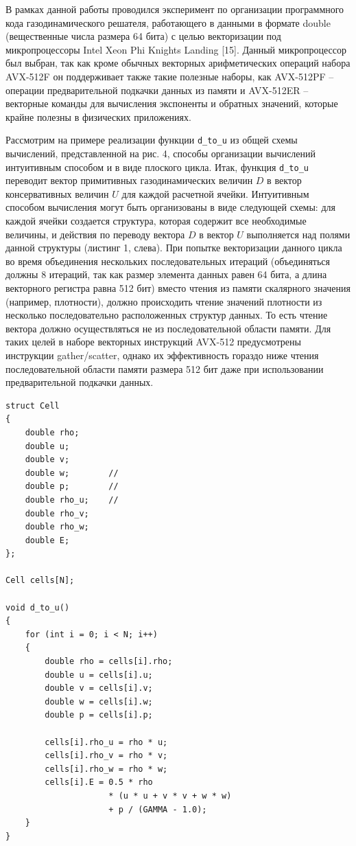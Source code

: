 В рамках данной работы проводился эксперимент по организации программного кода газодинамического решателя, работающего в данными в формате double (вещественные числа размера 64 бита) с целью векторизации под микропроцессоры Intel Xeon Phi Knights Landing [15].
Данный микропроцессор был выбран, так как кроме обычных векторных арифметических операций набора AVX-512F он поддерживает также такие полезные наборы, как AVX-512PF -- операции предварительной подкачки данных из памяти и AVX-512ER -- векторные команды для вычисления экспоненты и обратных значений, которые крайне полезны в физических приложениях.

Рассмотрим на примере реализации функции \texttt{d\_to\_u} из общей схемы вычислений, представленной на рис. 4, способы организации вычислений интуитивным способом и в виде плоского цикла.
Итак, функция \texttt{d\_to\_u} переводит вектор примитивных газодинамических величин $D$ в вектор консервативных величин $U$ для каждой расчетной ячейки.
Интуитивным способом вычисления могут быть организованы в виде следующей схемы: для каждой ячейки создается структура, которая содержит все необходимые величины, и действия по переводу вектора $D$ в вектор $U$ выполняется над полями данной структуры (листинг 1, слева).
При попытке векторизации данного цикла во время объединения нескольких последовательных итераций (объединяться должны 8 итераций, так как размер элемента данных равен 64 бита, а длина векторного регистра равна 512 бит) вместо чтения из памяти скалярного значения (например, плотности), должно происходить чтение значений плотности из несколько последовательно расположенных структур данных.
То есть чтение вектора должно осуществляться не из последовательной области памяти.
Для таких целей в наборе векторных инструкций AVX-512 предусмотрены инструкции gather/scatter, однако их эффективность гораздо ниже чтения последовательной области памяти размера 512 бит даже при использовании предварительной подкачки данных.

\begin{lstlisting}[caption={caption},label={label}]
struct Cell
{
    double rho;
    double u;
    double v;
    double w;        // 
    double p;        // 
    double rho_u;    // 
    double rho_v;
    double rho_w;
    double E;
};

Cell cells[N];

void d_to_u()
{
    for (int i = 0; i < N; i++)
    {
        double rho = cells[i].rho;
        double u = cells[i].u;
        double v = cells[i].v;
        double w = cells[i].w;
        double p = cells[i].p;

        cells[i].rho_u = rho * u;
        cells[i].rho_v = rho * v;
        cells[i].rho_w = rho * w;
        cells[i].E = 0.5 * rho
                     * (u * u + v * v + w * w)
                     + p / (GAMMA - 1.0);
    }
}
\end{lstlisting}

